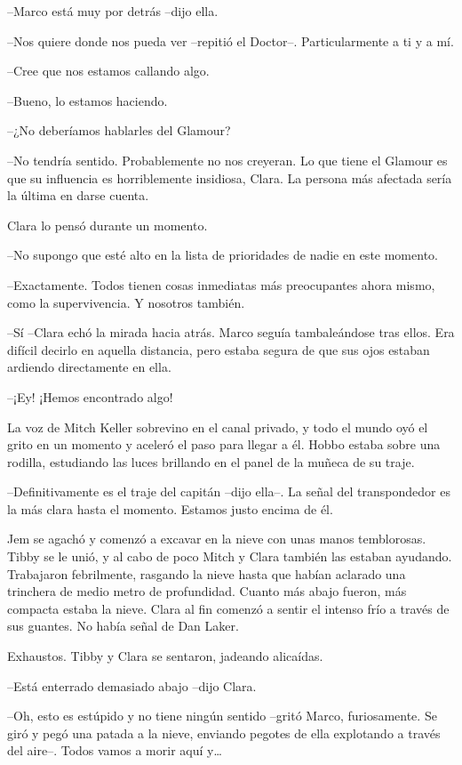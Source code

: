 {--Marco está muy por detrás --dijo ella.}

{--Nos quiere donde nos pueda ver --repitió el Doctor--. Particularmente
a ti y a mí.}

{--Cree que nos estamos callando algo.}

{--Bueno, lo estamos haciendo.}

{--¿No deberíamos hablarles del Glamour?}

{--No tendría sentido. Probablemente no nos creyeran. Lo que tiene el
 Glamour es que su influencia es horriblemente insidiosa, Clara. La
persona más afectada sería la última en darse cuenta.}

{Clara lo pensó durante un momento.}

{--No supongo que esté alto en la lista de prioridades de nadie en este
momento.}

{--Exactamente. Todos tienen cosas inmediatas más preocupantes ahora
mismo, como la supervivencia. Y nosotros también.}

{--Sí --Clara echó la mirada hacia atrás. Marco seguía tambaleándose tras
 ellos. Era difícil decirlo en aquella distancia, pero estaba segura de
que sus ojos estaban ardiendo directamente en ella.}

{--¡Ey! ¡Hemos encontrado algo!}

{La voz de Mitch Keller sobrevino en el canal privado, y todo el mundo
 oyó el grito en un momento y aceleró el paso para llegar a él. Hobbo
 estaba sobre una rodilla, estudiando las luces brillando en el panel de
la muñeca de su traje.}

{--Definitivamente es el traje del capitán --dijo ella--. La señal del
 transpondedor es la más clara hasta el momento. Estamos justo encima de
él.}

{Jem se agachó y comenzó a excavar en la nieve con unas manos
 temblorosas. Tibby se le unió, y al cabo de poco Mitch y Clara también
 las estaban ayudando. Trabajaron febrilmente, rasgando la nieve hasta
 que habían aclarado una trinchera de medio metro de profundidad. Cuanto
 más abajo fueron, más compacta estaba la nieve. Clara al fin comenzó a
 sentir el intenso frío a través de sus guantes. No había señal de Dan
Laker.}

{Exhaustos. Tibby y Clara se sentaron, jadeando alicaídas.}

{--Está enterrado demasiado abajo --dijo Clara.}

{--Oh, esto es estúpido y no tiene ningún sentido --gritó Marco,
 furiosamente. Se giró y pegó una patada a la nieve, enviando pegotes de
 ella explotando a través del aire--. Todos vamos a morir aquí
 y\ldots{}}

